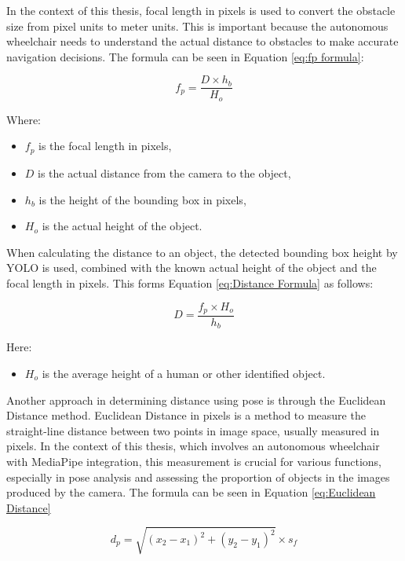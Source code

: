 In the context of this thesis, focal length in pixels is used to convert the obstacle size from pixel units to meter units. This is important because the autonomous wheelchair needs to understand the actual distance to obstacles to make accurate navigation decisions. The formula can be seen in Equation \ref{eq:fp formula}:

\begin{equation}
\label{eq:fp formula}
f_p = \frac{D \times h_b}{H_o}
\end{equation}

Where:
\begin{itemize}
\item $f_p$ is the focal length in pixels,
\item $D$ is the actual distance from the camera to the object,
\item $h_b$ is the height of the bounding box in pixels,
\item $H_o$ is the actual height of the object.
\end{itemize}

When calculating the distance to an object, the detected bounding box height by YOLO is used, combined with the known actual height of the object and the focal length in pixels. This forms Equation \ref{eq:Distance Formula} as follows:

\begin{equation}
\label{eq:Distance Formula}
D = \frac{f_p \times H_o}{h_b}
\end{equation}

Here:
\begin{itemize}
\item $H_o$ is the average height of a human or other identified object.
\end{itemize}

Another approach in determining distance using pose is through the Euclidean Distance method. Euclidean Distance in pixels is a method to measure the straight-line distance between two points in image space, usually measured in pixels. In the context of this thesis, which involves an autonomous wheelchair with MediaPipe integration, this measurement is crucial for various functions, especially in pose analysis and assessing the proportion of objects in the images produced by the camera. The formula can be seen in Equation \ref{eq:Euclidean Distance}

\begin{equation}
\label{eq:Euclidean Distance}
d_p = \sqrt{(x_2 - x_1)^2 + (y_2 - y_1)^2} \times s_f
\end{equation}

